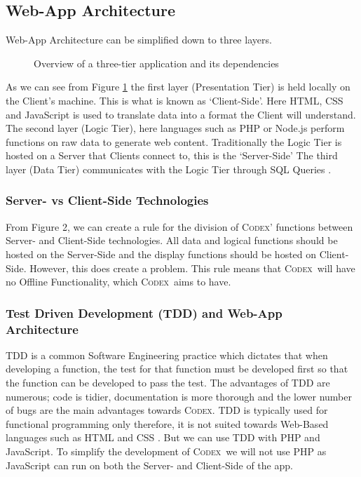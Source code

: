 \documentclass[final]{cmpreport}
\newcommand{\Codex}{\textsc{Codex}}
\begin{document}
	\subsection{Web-App Architecture} \label{Web-Arch}
	Web-App Architecture can be simplified down to three layers.
	\begin{figure}
		\centering
		\caption{Overview of a three-tier application and its dependencies \citep{SecurityWebApps}} \label{Web-App-Arch}
	\end{figure}
	As we can see from Figure \ref{Web-App-Arch} the first layer (Presentation Tier) is held locally on the Client's machine. This is what is known as `Client-Side'. Here HTML, CSS and JavaScript is used to translate data into a format the Client will understand. The second layer (Logic Tier), here languages such as PHP or Node.js perform functions on raw data to generate web content. Traditionally the Logic Tier is hosted on a Server that Clients connect to, this is the `Server-Side' The third layer (Data Tier) communicates with the Logic Tier through SQL Queries \citep{SecurityWebApps}.
	
	\subsubsection{Server- vs Client-Side Technologies}
	From Figure 2, we can create a rule for the division of \Codex' functions between Server- and Client-Side technologies. All data and logical functions should be hosted on the Server-Side and the display functions should be hosted on Client-Side. However, this does create a problem. This rule means that \Codex \ will have no Offline Functionality, which \Codex \ aims to have.
	
	\subsubsection{Test Driven Development (TDD) and Web-App Architecture}
	TDD is a common Software Engineering practice which dictates that when developing a function, the test for that function must be developed first so that the function can be developed to pass the test. The advantages of TDD are numerous; code is tidier, documentation is more thorough and the lower number of bugs are the main advantages towards \Codex. TDD is typically used for functional programming only therefore, it is not suited towards Web-Based languages such as HTML and CSS \citep{TDD}. But we can use TDD with PHP and JavaScript. To simplify the development of \Codex \ we will not use PHP as JavaScript can run on both the Server- and Client-Side of the app.
\end{document}
